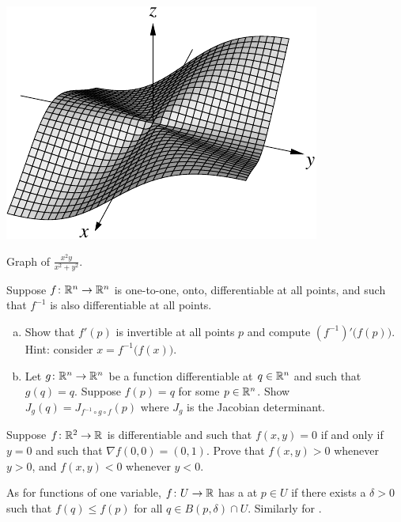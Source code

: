 \begin{myfigureht}
\includegraphics{figures/xsqyxsqysq}
\caption{Graph of $\frac{x^2y}{x^2+y^2}$.\label{fig:xsqyxsqysq}}
\end{myfigureht}

\begin{samepage}
\begin{exercise}
Suppose $f \colon {\mathbb{R}}^n \to {\mathbb{R}}^n$ is one-to-one, onto, differentiable at all
points, and such that $f^{-1}$ is also differentiable at all points.
\begin{enumerate}[a)]
\item
Show that $f'(p)$ is invertible at all points $p$ and compute
${(f^{-1})}'\bigl(f(p)\bigr)$.  Hint: consider $x = f^{-1}\bigl(f(x)\bigr)$.
\item
Let $g \colon {\mathbb{R}}^n \to {\mathbb{R}}^n$ be a function differentiable at $q \in {\mathbb{R}}^n$
and such that $g(q)=q$.  Suppose $f(p) = q$ for some $p \in {\mathbb{R}}^n$.
Show $J_g(q) = J_{f^{-1} \circ g \circ f}(p)$ where $J_g$ is the Jacobian
determinant.
\end{enumerate}
\end{exercise}
\end{samepage}

\begin{exercise}
Suppose $f \colon {\mathbb{R}}^2 \to {\mathbb{R}}$ is differentiable and such that
$f(x,y) = 0$ if and only if $y=0$ and such that $\nabla f(0,0) = (0,1)$.
Prove that $f(x,y) > 0$ whenever $y > 0$, and
$f(x,y) < 0$ whenever $y < 0$.
\end{exercise}

\begin{exnote}
As for functions of one variable, $f \colon U \to {\mathbb{R}}$ has a
\emph{} at $p \in U$ if there exists
a $\delta >0$ such that $f(q) \leq f(p)$ for all $q \in B(p,\delta) \cap U$.
Similarly for \emph{}.
\end{exnote}

